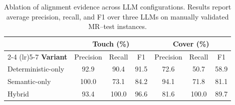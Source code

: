 \begin{table}[h]
\centering
\caption{Ablation of alignment evidence across LLM configurations. Results report average precision, recall, and F1 over three LLMs on manually validated MR--test instances.}
\label{tab:alignment-ablation}
\small
\setlength{\tabcolsep}{2pt}
\begin{tabular}{lcccccc}
\toprule
& \multicolumn{3}{c}{\textbf{Touch} (\%)}& \multicolumn{3}{c}{\textbf{Cover} (\%)} \\
 \cmidrule(lr){2-4} \cmidrule(lr){5-7}
\textbf{Variant} & Precision & Recall & F1 & Precision & Recall & F1 \\
\midrule
Deterministic-only
& 92.9 & 90.4 & 91.5
& 72.6 & 50.7 & 58.9 \\
Semantic-only
& 100.0 & 73.1 & 84.2
& 94.1 & 71.8 & 81.1 \\
Hybrid
& 93.4 & 100.0 & 96.6
& 81.6 & 100.0 & 89.7 \\
\bottomrule
\end{tabular}
\end{table}










